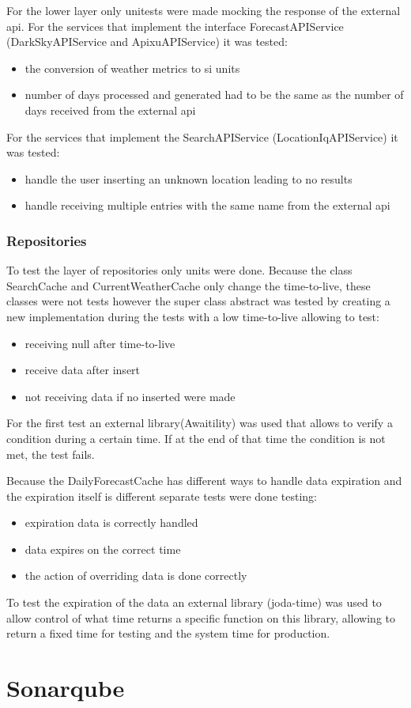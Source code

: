 \documentclass[12pt]{article}
\begin{document}
For the lower layer only unitests were made mocking the response of the external api. For the
  services that implement the interface ForecastAPIService (DarkSkyAPIService and
  ApixuAPIService) it was tested:
  \begin{itemize}
    \item the conversion of weather metrics to si units
    \item number of days processed and generated had to be the same as the number of days
      received from the external api
  \end{itemize}
  For the services that implement the SearchAPIService (LocationIqAPIService) it was tested:
  \begin{itemize}
    \item handle the user inserting an unknown location leading to no results
    \item handle receiving multiple entries with the same name from the external api
  \end{itemize}

\subsubsection{Repositories}

To test the layer of repositories only units were done. Because the class SearchCache and
  CurrentWeatherCache only change the time-to-live, these classes were not tests however
  the super class abstract was tested by creating a new implementation during the tests with a low
  time-to-live allowing to test:
  \begin{itemize}
    \item receiving null after time-to-live
    \item receive data after insert
    \item not receiving data if no inserted were made
  \end{itemize}
  For the first test an external library(Awaitility) was used that allows to verify a condition
    during a certain time. If at the end of that time the condition is not met,
    the test fails.

Because the DailyForecastCache has different ways to handle data expiration and
  the expiration itself is different separate tests were done testing:
  \begin{itemize}
    \item expiration data is correctly handled
    \item data expires on the correct time
    \item the action of overriding data is done correctly
  \end{itemize}
  To test the expiration of the data an external library (joda-time) was used to allow
    control of what time returns a specific function on this library, allowing to return a
    fixed time for testing and the system time for production.

\section{Sonarqube}
\end{document}

